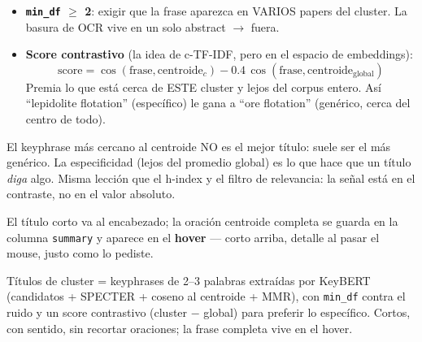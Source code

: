 \documentclass[11pt,a4paper]{article}
\begin{document}
\begin{itemize}
  \item \textbf{\texttt{min\_df} $\geq$ 2}: exigir que la frase aparezca en VARIOS papers
        del cluster. La basura de OCR vive en un solo abstract $\to$ fuera.
  \item \textbf{Score contrastivo} (la idea de c-TF-IDF, pero en el espacio de
        embeddings):
        \[
        \mathrm{score} = \cos(\mathrm{frase}, \mathrm{centroide}_c)
                       - 0.4 \, \cos(\mathrm{frase}, \mathrm{centroide}_{\mathrm{global}})
        \]
        Premia lo que está cerca de ESTE cluster y lejos del corpus entero. Así
        ``lepidolite flotation'' (específico) le gana a ``ore flotation'' (genérico,
        cerca del centro de todo).
\end{itemize}

\begin{ojo}
El keyphrase más cercano al centroide NO es el mejor título: suele ser el más genérico.
La especificidad (lejos del promedio global) es lo que hace que un título \emph{diga}
algo. Misma lección que el h-index y el filtro de relevancia: la señal está en el
contraste, no en el valor absoluto.
\end{ojo}

\begin{practica}
El título corto va al encabezado; la oración centroide completa se guarda en la columna
\texttt{summary} y aparece en el \textbf{hover} --- corto arriba, detalle al pasar el
mouse, justo como lo pediste.
\end{practica}

\begin{resumen}
Títulos de cluster = keyphrases de 2--3 palabras extraídas por KeyBERT (candidatos +
SPECTER + coseno al centroide + MMR), con \texttt{min\_df} contra el ruido y un score
contrastivo (cluster $-$ global) para preferir lo específico. Cortos, con sentido, sin
recortar oraciones; la frase completa vive en el hover.
\end{resumen}
\end{document}
